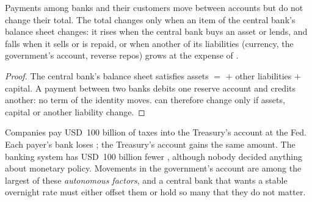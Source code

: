 \begin{proposition}\label{prop:m2:central-banks-and-the-short-rate:total}
Payments among banks and their customers move  between accounts but
do not change their total. The total changes only when an item of the central
bank's balance sheet changes: it rises when the central bank buys an asset or
lends, and falls when it sells or is repaid, or when another of its
liabilities (currency, the government's account, reverse repos) grows at the
expense of .
\end{proposition}
\begin{proof}
The central bank's balance sheet satisfies assets $=$  $+$ other
liabilities $+$ capital. A payment between two banks debits one reserve
account and credits another: no term of the identity moves.  can
therefore change only if assets, capital or another liability change.
\end{proof}

\begin{example}\label{ex:m2:central-banks-and-the-short-rate:tax}
Companies pay USD~100 billion of taxes into the Treasury's account at the Fed.
Each payer's bank loses ; the Treasury's account gains the same
amount. The banking system has USD~100 billion fewer , although
nobody decided anything about monetary policy. Movements in the government's
account are among the largest of these \emph{autonomous factors}, and a central
bank that wants a stable overnight rate must either offset them or hold so
many  that they do not matter.
\end{example}

